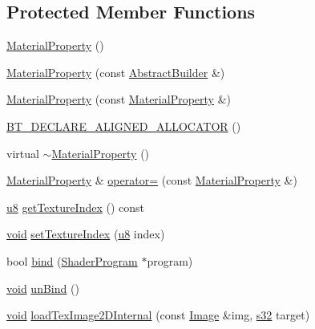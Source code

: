 \subsection*{Protected Member Functions}
\begin{DoxyCompactItemize}
\item 
\mbox{\hyperlink{classnjli_1_1_material_property_a6811e536c0304699a61cfc1024f2ba8f}{Material\+Property}} ()
\item 
\mbox{\hyperlink{classnjli_1_1_material_property_adb5e4547cc2288c3a2eb3ff527550b7e}{Material\+Property}} (const \mbox{\hyperlink{classnjli_1_1_abstract_builder}{Abstract\+Builder}} \&)
\item 
\mbox{\hyperlink{classnjli_1_1_material_property_a7c76ca284edd6d7ac17b90ec0f0367f1}{Material\+Property}} (const \mbox{\hyperlink{classnjli_1_1_material_property}{Material\+Property}} \&)
\item 
\mbox{\hyperlink{classnjli_1_1_material_property_ae5c6b3221d3eba4205c5301d440c00ca}{B\+T\+\_\+\+D\+E\+C\+L\+A\+R\+E\+\_\+\+A\+L\+I\+G\+N\+E\+D\+\_\+\+A\+L\+L\+O\+C\+A\+T\+OR}} ()
\item 
virtual \mbox{\hyperlink{classnjli_1_1_material_property_a75c8490c52755625c177afc58c229a93}{$\sim$\+Material\+Property}} ()
\item 
\mbox{\hyperlink{classnjli_1_1_material_property}{Material\+Property}} \& \mbox{\hyperlink{classnjli_1_1_material_property_a2be91e903f98e3eea9309485e76a7f79}{operator=}} (const \mbox{\hyperlink{classnjli_1_1_material_property}{Material\+Property}} \&)
\item 
\mbox{\hyperlink{_util_8h_aed742c436da53c1080638ce6ef7d13de}{u8}} \mbox{\hyperlink{classnjli_1_1_material_property_a50438fb39042ba68cd581bff9658b2b3}{get\+Texture\+Index}} () const
\item 
\mbox{\hyperlink{_thread_8h_af1e856da2e658414cb2456cb6f7ebc66}{void}} \mbox{\hyperlink{classnjli_1_1_material_property_a1ec8ff2f8e2d6289361d1fe9c8838807}{set\+Texture\+Index}} (\mbox{\hyperlink{_util_8h_aed742c436da53c1080638ce6ef7d13de}{u8}} index)
\item 
bool \mbox{\hyperlink{classnjli_1_1_material_property_a51d5f7827d6a08ab84c0ec549dbaf9de}{bind}} (\mbox{\hyperlink{classnjli_1_1_shader_program}{Shader\+Program}} $\ast$program)
\item 
\mbox{\hyperlink{_thread_8h_af1e856da2e658414cb2456cb6f7ebc66}{void}} \mbox{\hyperlink{classnjli_1_1_material_property_ae15d33487d858135cb0366bc629fe255}{un\+Bind}} ()
\item 
\mbox{\hyperlink{_thread_8h_af1e856da2e658414cb2456cb6f7ebc66}{void}} \mbox{\hyperlink{classnjli_1_1_material_property_a9bf91c2260c96d60ee8ef7eaa491e8de}{load\+Tex\+Image2\+D\+Internal}} (const \mbox{\hyperlink{classnjli_1_1_image}{Image}} \&img, \mbox{\hyperlink{_util_8h_aa62c75d314a0d1f37f79c4b73b2292e2}{s32}} target)

\end{DoxyCompactItemize}
